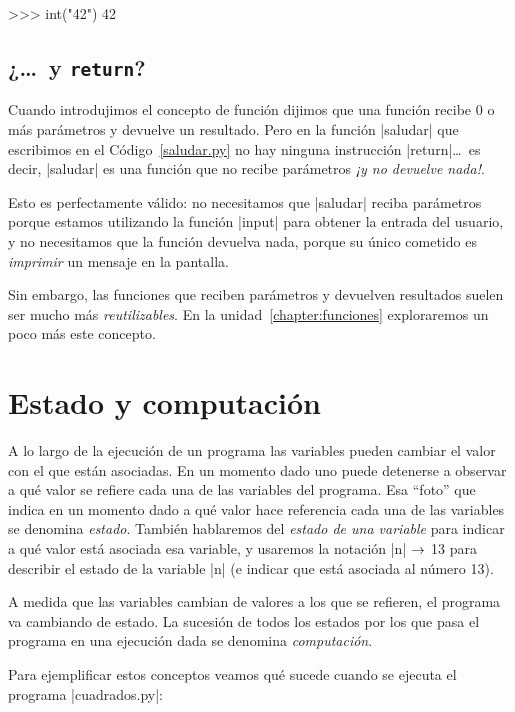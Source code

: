 \begin{codigo-python-sn}
>>> int("42")
42
\end{codigo-python-sn}

\subsection*{¿\ldots\ y \verb|return|?}

Cuando introdujimos el concepto de función dijimos que una función recibe 0 o
más parámetros y devuelve un resultado. Pero en la función |saludar| que
escribimos en el Código~\ref{saludar.py} no hay ninguna instrucción
|return|\dots\ 
es decir, |saludar| es una función que no recibe parámetros \emph{¡y no devuelve
nada!}.

Esto es perfectamente válido: no necesitamos que |saludar| reciba parámetros
porque estamos utilizando la función |input| para obtener la entrada del
usuario, y no necesitamos que la función devuelva nada, porque su único
cometido es \emph{imprimir} un mensaje en la pantalla.

Sin embargo, las funciones que reciben parámetros y devuelven resultados suelen
ser mucho más \emph{reutilizables}. En la unidad~\ref{chapter:funciones}
exploraremos un poco más este concepto.

%
%
\clearpage

\section{Estado y computación}

A lo largo de la ejecución de un programa las variables pueden
cambiar el valor con el que están asociadas. En un momento dado
uno puede detenerse a observar a qué valor se refiere cada una de
las variables del programa. Esa \enquote{foto} que indica en un momento dado
a qué valor hace referencia cada una de las variables se denomina
\emph{estado}. También hablaremos del \emph{estado de una variable}
para indicar a qué valor está asociada esa variable, y usaremos la
notación |n| $\rightarrow$ 13 para describir el estado de la variable |n| (e indicar
que está asociada al número 13).

A medida que las variables cambian de valores a los que se
refieren, el programa va cambiando de estado. La sucesión de todos
los estados por los que pasa el programa en una ejecución dada se
denomina \emph{computación}.

Para ejemplificar estos conceptos veamos qué sucede cuando se
ejecuta el programa |cuadrados.py|:

